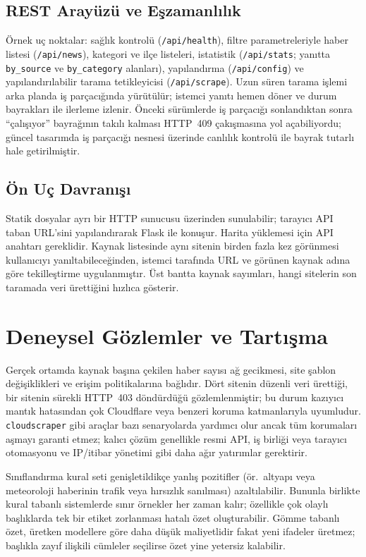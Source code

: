\documentclass[conference,a4paper]{IEEEtran}
\begin{document}
\subsection{REST Arayüzü ve Eşzamanlılık}
Örnek uç noktalar: sağlık kontrolü (\texttt{/api/health}), filtre parametreleriyle haber listesi (\texttt{/api/news}), kategori ve ilçe listeleri, istatistik (\texttt{/api/stats}; yanıtta \texttt{by\_source} ve \texttt{by\_category} alanları), yapılandırma (\texttt{/api/config}) ve yapılandırılabilir tarama tetikleyicisi (\texttt{/api/scrape}). Uzun süren tarama işlemi arka planda iş parçacığında yürütülür; istemci yanıtı hemen döner ve durum bayrakları ile ilerleme izlenir. Önceki sürümlerde iş parçacığı sonlandıktan sonra ``çalışıyor'' bayrağının takılı kalması HTTP~409 çakışmasına yol açabiliyordu; güncel tasarımda iş parçacığı nesnesi üzerinde canlılık kontrolü ile bayrak tutarlı hale getirilmiştir.

\subsection{Ön Uç Davranışı}
Statik dosyalar ayrı bir HTTP sunucusu üzerinden sunulabilir; tarayıcı API taban URL'sini yapılandırarak Flask ile konuşur. Harita yüklemesi için API anahtarı gereklidir. Kaynak listesinde aynı sitenin birden fazla kez görünmesi kullanıcıyı yanıltabileceğinden, istemci tarafında URL ve görünen kaynak adına göre tekilleştirme uygulanmıştır. Üst bantta kaynak sayımları, hangi sitelerin son taramada veri ürettiğini hızlıca gösterir.

\section{Deneysel Gözlemler ve Tartışma}
Gerçek ortamda kaynak başına çekilen haber sayısı ağ gecikmesi, site şablon değişiklikleri ve erişim politikalarına bağlıdır. Dört sitenin düzenli veri ürettiği, bir sitenin sürekli HTTP~403 döndürdüğü gözlemlenmiştir; bu durum kazıyıcı mantık hatasından çok Cloudflare veya benzeri koruma katmanlarıyla uyumludur. \texttt{cloudscraper} gibi araçlar bazı senaryolarda yardımcı olur ancak tüm korumaları aşmayı garanti etmez; kalıcı çözüm genellikle resmi API, iş birliği veya tarayıcı otomasyonu ve IP/itibar yönetimi gibi daha ağır yatırımlar gerektirir.

Sınıflandırma kural seti genişletildikçe yanlış pozitifler (ör.\ altyapı veya meteoroloji haberinin trafik veya hırsızlık sanılması) azaltılabilir. Bununla birlikte kural tabanlı sistemlerde sınır örnekler her zaman kalır; özellikle çok olaylı başlıklarda tek bir etiket zorlanması hatalı özet oluşturabilir. Gömme tabanlı özet, üretken modellere göre daha düşük maliyetlidir fakat yeni ifadeler üretmez; başlıkla zayıf ilişkili cümleler seçilirse özet yine yetersiz kalabilir.
\end{document}

